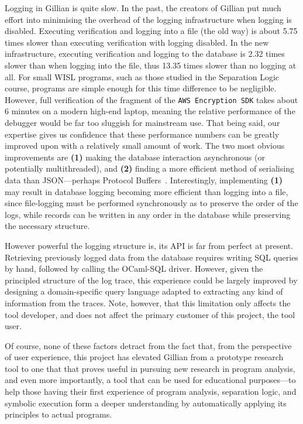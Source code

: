 Logging in Gillian is quite slow. In the past, the creators of Gillian put much
effort into minimising the overhead of the logging infrastructure when logging
is disabled. Executing verification and logging into a file (the old way) is
about 5.75\footnotemark[1]{} times slower than executing verification with
logging disabled. In the new infrastructure, executing verification and logging
to the database is 2.32\footnotemark[1]{} times slower than when logging into
the file, thus 13.35\footnotemark[1]{} times slower than no logging at all.
For small WISL programs, such as those studied in the Separation Logic course,
programs are simple enough for this time difference to be negligible. However,
full verification of the fragment of the \texttt{AWS Encryption SDK} takes about
6 minutes on a modern high-end laptop, meaning the relative performance of the
debugger would be far too sluggish for mainstream use.  That being said,
our expertise gives us confidence that these performance numbers can be
greatly improved upon with a relatively small amount of work.
The two most obvious improvements are \textbf{(1)} making the database
interaction asynchronous (or potentially multithreaded), and \textbf{(2)}
finding a more efficient method of serialising data than JSON---perhaps
Protocol Buffers~\cite{protobuf}. Interestingly, implementing \textbf{(1)} may
result in database logging becoming more efficient than logging into a file,
since file-logging must be performed synchronously as to preserve the order of
the logs, while records can be written in any order in the database while
preserving the necessary structure.

However powerful the logging structure is, its API is far from perfect at
present. Retrieving previously logged data from the database requires writing
SQL queries by hand, followed by calling the OCaml-SQL driver. However, given
the principled structure of the log trace, this experience could be largely
improved by designing a domain-specific query language adapted to extracting any
kind of information from the traces. Note, however, that this limitation only
affects the tool developer, and does not affect the primary customer of this
project, the tool user.

Of course, none of these factors detract from the fact that, from the
perspective of user experience, this project has elevated Gillian from a
prototype research tool to one that that proves useful in pursuing new research
in program analysis, and even more importantly, a tool that can be used for
educational purposes---to help those having their first experience of
program analysis, separation logic, and symbolic execution form a deeper
understanding by automatically applying its principles to actual programs.


